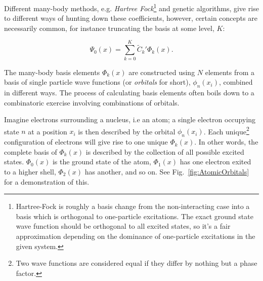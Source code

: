 Different many-body methods, e.g. \textit{Hartree Fock}\footnote{Hartree-Fock is roughly a basis change from the non-interacting case into a basis which is orthogonal to one-particle excitations. The exact ground state wave function should be orthogonal to all excited states, so it's a fair approximation depending on the dominance of one-particle excitations in the given system.} and genetic algorithms, give rise to different ways of hunting down these coefficients, however, certain concepts are necessarily common, for instance truncating the basis at some level, $K$:

\begin{equation}
\label{eq:manyBodyExpTrunc}
 \Psi_0(x) = \sum_{k=0}^K \tilde{C}_k'\Phi_k(x).
\end{equation}

The many-body basis elements $\Phi_k(x)$ are constructed using $N$ elements from a basis of single particle wave functions (or \textit{orbitals} for short), $\phi_n(x_i)$, combined in different ways. The process of calculating basis elements often boils down to a combinatoric exercise involving combinations of orbitals.

Imagine electrons surrounding a nucleus, i.e an atom; a single electron occupying state $n$ at a position $x_i$ is then described by the orbital $\phi_n(x_i)$. Each unique\footnote{Two wave functions are considered equal if they differ by nothing but a phase factor.} configuration of electrons will give rise to one unique $\Phi_k(x)$. In other words, the complete basis of $\Phi_k(x)$ is described by the collection of all possible excited states. $\Phi_0(x)$ is the ground state of the atom, $\Phi_1(x)$ has one electron exited to a higher shell, $\Phi_2(x)$ has another, and so on. See Fig.~\ref{fig:AtomicOrbitals} for a demonstration of this.

